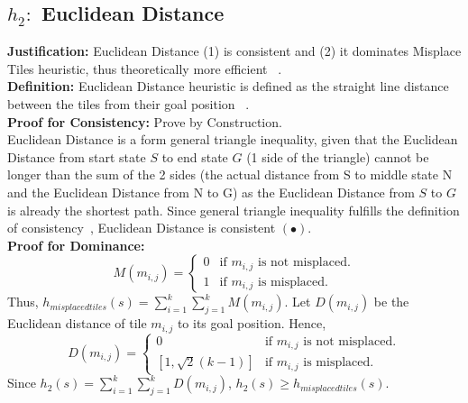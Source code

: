 \documentclass[runningheads]{llncs}
\begin{document}
\subsection{\(h_2:\) Euclidean Distance}
\textbf{Justification:} Euclidean Distance (1) is consistent and (2) it dominates Misplace Tiles heuristic, thus theoretically more efficient ~\cite[104]{stuart_russell_artifical_2010}. \\
\textbf{Definition:} Euclidean Distance heuristic is defined as the straight line distance between the tiles from their goal position ~\cite{rosalind_euclidean_nodate}. \\
\textbf{Proof for Consistency:} Prove by Construction. \\
Euclidean Distance is a form general triangle inequality, given that the Euclidean Distance from start state \( S \) to end state \( G \) (1 side of the triangle) cannot be longer than the sum of the 2 sides (the actual distance from S to middle state N and the Euclidean Distance from N to G) as the Euclidean Distance from \( S \) to \( G \) is already the shortest path. 
Since general triangle inequality fulfills the definition of consistency~\cite[p95]{stuart_russell_artifical_2010}, Euclidean Distance is consistent \( (\bullet) \). \\
\textbf{Proof for Dominance:}
\[
	M(m_{i,j}) =
	    \begin{cases}
	      0 & \text{if \(m_{i,j} \) is not misplaced.}\\
	      1 & \text{if \(m_{i,j} \) is misplaced.}
	    \end{cases} 
\]
Thus, \( h_{misplaced tiles}(s) = \sum_{i=1}^k \sum_{j=1}^k M(m_{i,j}) \). Let \(D(m_{i,j})\) be the Euclidean distance of tile \(m_{i,j}\) to its goal position. Hence,
\[
	D(m_{i,j}) =
	    \begin{cases}
	      0 & \text{if \(m_{i,j} \) is not misplaced.}\\
	      [1, \sqrt{2}(k-1)] & \text{if \(m_{i,j} \) is misplaced.}
	    \end{cases} 
\]
Since \(h_2(s) = \sum_{i=1}^k \sum_{j=1}^k D(m_{i,j}) \), \(h_2(s) \geq h_{misplaced tiles}(s)\).
\end{document}
